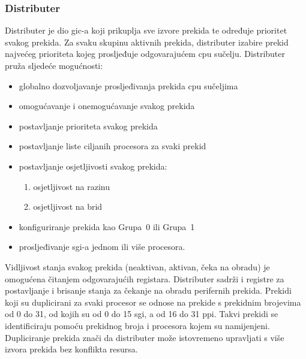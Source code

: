 \documentclass[times, utf8, diplomski, numeric]{fer}
\begin{document}
\subsubsection{Distributer}
Distributer je dio \gls{gic}-a koji prikuplja sve izvore prekida te određuje prioritet svakog prekida. Za svaku skupinu aktivnih
prekida, distributer izabire prekid najvećeg prioriteta kojeg prosljeđuje odgovarajućem \gls{cpu} sučelju. Distributer pruža
sljedeće mogućnosti:
\begin{itemize}
  \item{globalno dozvoljavanje prosljeđivanja prekida \gls{cpu} sučeljima}
  \item{omogućavanje i onemogućavanje svakog prekida}
  \item{postavljanje prioriteta svakog prekida}
  \item{postavljanje liste ciljanih procesora za svaki prekid}
  \item{postavljanje osjetljivosti svakog prekida:}
  \begin{enumerate}
    \item{osjetljivost na razinu}
    \item{osjetljivost na brid}
  \end{enumerate}
  \item{konfiguriranje prekida kao Grupa~0 ili Grupa~1}
  \item{prosljeđivanje \gls{sgi}-a jednom ili više procesora.}
\end{itemize}
Vidljivost stanja svakog prekida (neaktivan, aktivan, čeka na obradu) je omogućena čitanjem odgovarajućih registara.
Distributer sadrži i registre za postavljanje i brisanje stanja za čekanje na obradu perifernih prekida. Prekidi koji
su duplicirani za svaki procesor se odnose na prekide s prekidnim brojevima od 0 do 31, od kojih su od 0 do 15 \gls{sgi}, a
od 16 do 31 \gls{ppi}. Takvi prekidi se identificiraju pomoću prekidnog broja i procesora kojem su namijenjeni. Dupliciranje
prekida znači da distributer može istovremeno upravljati s više izvora prekida bez konflikta resursa.
\end{document}
